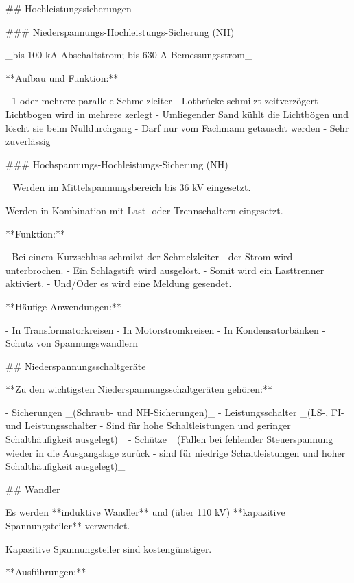 \begin{markdown}

## Hochleistungssicherungen

### Niederspannungs-Hochleistungs-Sicherung (NH)

_bis 100 kA Abschaltstrom; bis 630 A Bemessungsstrom_

**Aufbau und Funktion:**

- 1 oder mehrere parallele Schmelzleiter
- Lotbrücke schmilzt zeitverzögert
- Lichtbogen wird in mehrere zerlegt
- Umliegender Sand kühlt die Lichtbögen und löscht sie beim Nulldurchgang
- Darf nur vom Fachmann getauscht werden
- Sehr zuverlässig

### Hochspannungs-Hochleistungs-Sicherung (NH)

_Werden im Mittelspannungsbereich bis 36 kV eingesetzt._

Werden in Kombination mit Last- oder Trennschaltern eingesetzt.

**Funktion:**

- Bei einem Kurzschluss schmilzt der Schmelzleiter - der Strom wird unterbrochen.
- Ein Schlagstift wird ausgelöst.
- Somit wird ein Lasttrenner aktiviert.
- Und/Oder es wird eine Meldung gesendet.

**Häufige Anwendungen:**

- In Transformatorkreisen
- In Motorstromkreisen
- In Kondensatorbänken
- Schutz von Spannungswandlern

## Niederspannungsschaltgeräte

**Zu den wichtigsten Niederspannungsschaltgeräten gehören:**

- Sicherungen _(Schraub- und NH-Sicherungen)_
- Leistungsschalter _(LS-, FI- und Leistungsschalter - Sind für hohe Schaltleistungen und geringer Schalthäufigkeit ausgelegt)_
- Schütze _(Fallen bei fehlender Steuerspannung wieder in die Ausgangslage zurück - sind für niedrige Schaltleistungen und hoher Schalthäufigkeit ausgelegt)_

## Wandler


Es werden **induktive Wandler** und (über 110 kV) **kapazitive Spannungsteiler** verwendet.

Kapazitive Spannungsteiler sind kostengünstiger.

**Ausführungen:**


\end{markdown}
